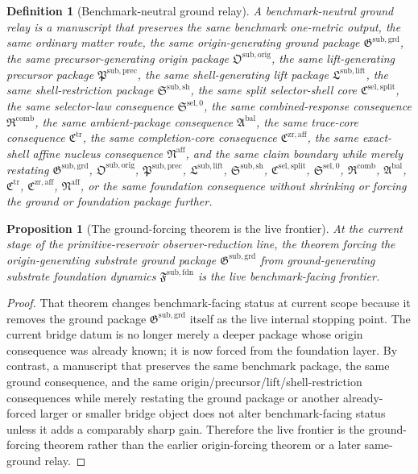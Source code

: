 \documentclass[11pt]{article}
\newcommand{\CompletionCore}{\mathfrak C^{\mathrm{zr,aff}}}
\newcommand{\TraceCore}{\mathfrak C^{\mathrm{tr}}}
\newcommand{\AffineNucleus}{\mathfrak N^{\mathrm{aff}}}
\newcommand{\AmbientPackage}{\mathfrak A^{\mathrm{bal}}}
\newcommand{\CombinedLaw}{\mathfrak R^{\mathrm{comb}}}
\newcommand{\SelectorLaw}{\mathfrak S^{\mathrm{sel},0}}
\newcommand{\SelectorCore}{\mathfrak C^{\mathrm{sel,split}}}
\newcommand{\ShellRestriction}{\mathfrak S^{\mathrm{sub,sh}}}
\newcommand{\LiftPackage}{\mathfrak L^{\mathrm{sub,lift}}}
\newcommand{\PrecursorPackage}{\mathfrak P^{\mathrm{sub,prec}}}
\newcommand{\OriginPackage}{\mathfrak O^{\mathrm{sub,orig}}}
\newcommand{\GroundPackage}{\mathfrak G^{\mathrm{sub,grd}}}
\newcommand{\FoundationPackage}{\mathfrak F^{\mathrm{sub,fdn}}}
\newtheorem{definition}{Definition}
\newtheorem{proposition}{Proposition}
\begin{document}
\begin{definition}[Benchmark-neutral ground relay]
A \emph{benchmark-neutral ground relay} is a manuscript that preserves the same benchmark one-metric output, the same ordinary matter route, the same origin-generating ground package \(\GroundPackage\), the same precursor-generating origin package \(\OriginPackage\), the same lift-generating precursor package \(\PrecursorPackage\), the same shell-generating lift package \(\LiftPackage\), the same shell-restriction package \(\ShellRestriction\), the same split selector-shell core \(\SelectorCore\), the same selector-law consequence \(\SelectorLaw\), the same combined-response consequence \(\CombinedLaw\), the same ambient-package consequence \(\AmbientPackage\), the same trace-core consequence \(\TraceCore\), the same completion-core consequence \(\CompletionCore\), the same exact-shell affine nucleus consequence \(\AffineNucleus\), and the same claim boundary while merely restating \(\GroundPackage\), \(\OriginPackage\), \(\PrecursorPackage\), \(\LiftPackage\), \(\ShellRestriction\), \(\SelectorCore\), \(\SelectorLaw\), \(\CombinedLaw\), \(\AmbientPackage\), \(\TraceCore\), \(\CompletionCore\), \(\AffineNucleus\), or the same foundation consequence without shrinking or forcing the ground or foundation package further.
\end{definition}

\begin{proposition}[The ground-forcing theorem is the live frontier]
At the current stage of the primitive-reservoir observer-reduction line, the theorem forcing the origin-generating substrate ground package \(\GroundPackage\) from ground-generating substrate foundation dynamics \(\FoundationPackage\) is the live benchmark-facing frontier.
\end{proposition}

\begin{proof}
That theorem changes benchmark-facing status at current scope because it removes the ground package \(\GroundPackage\) itself as the live internal stopping point. The current bridge datum is no longer merely a deeper package whose origin consequence was already known; it is now forced from the foundation layer. By contrast, a manuscript that preserves the same benchmark package, the same ground consequence, and the same origin/precursor/lift/shell-restriction consequences while merely restating the ground package or another already-forced larger or smaller bridge object does not alter benchmark-facing status unless it adds a comparably sharp gain. Therefore the live frontier is the ground-forcing theorem rather than the earlier origin-forcing theorem or a later same-ground relay.
\end{proof}
\end{document}

